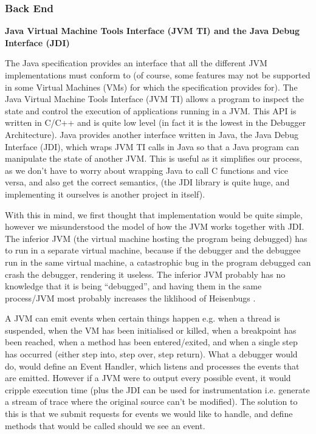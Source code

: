 \documentclass[11pt, a4paper]{article}
\begin{document}
\subsubsection{Back End}
\textbf{Java Virtual Machine Tools Interface (JVM TI) and the Java Debug Interface (JDI)}

The Java specification provides an interface that all the different JVM implementations must conform to (of course, some features may not be supported in some Virtual Machines (VMs) for which the specification provides for).
The Java Virtual Machine Tools Interface (JVM TI) \cite{jvmti} allows a program to inspect the state and control the execution of applications running in a JVM.
This API is written in C/C++ and is quite low level (in fact it is the lowest in the Debugger Architecture).
Java provides another interface written in Java, the Java Debug Interface (JDI), which wraps JVM TI calls in Java so that a Java program can manipulate the state of another JVM.
This is useful as it simplifies our process, as we don't have to worry about wrapping Java to call C functions and vice versa, and also get the correct semantics, (the JDI library is quite huge, and implementing it ourselves is another project in itself).

With this in mind, we first thought that implementation would be quite simple, however we misunderstood the model of how the JVM works together with JDI.
The inferior JVM (the virtual machine hosting the program being debugged) has to run in a separate virtual machine, because if the debugger and the debuggee run in the same virtual machine, a catastrophic bug in the program debugged can crash the debugger, rendering it useless. 
The inferior JVM probably has no knowledge that it is being ``debugged'', and having them in the same process/JVM most probably increases the liklihood of Heisenbugs \cite{heisenbug}.

A JVM can emit events when certain things happen e.g. when a thread is suspended, when the VM has been initialised or killed, when a breakpoint has been reached, when a method has been entered/exited, and when a single step has occurred (either step into, step over, step return).
What a debugger would do, would define an Event Handler, which listens and processes the events that are emitted.
However if a JVM were to output every possible event, it would cripple execution time (plus the JDI can be used for instrumentation i.e. generate a stream of trace where the original source can't be modified).
The solution to this is that we submit requests for events we would like to handle, and define methods that would be called should we see an event.
\end{document}
